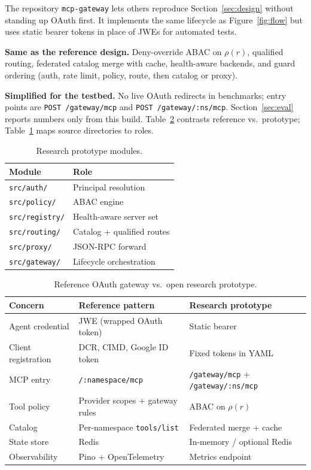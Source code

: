 \documentclass[11pt]{article}
\newcommand{\code}[1]{\texttt{#1}}
\begin{document}
The repository \code{mcp-gateway} lets others reproduce Section~\ref{sec:design} without standing up OAuth first.
It implements the same lifecycle as Figure~\ref{fig:flow} but uses static bearer tokens in place of JWEs for automated tests.

\textbf{Same as the reference design.}
Deny-override ABAC on $\rho(r)$, qualified routing, federated catalog merge with cache, health-aware backends, and guard ordering (auth, rate limit, policy, route, then catalog or proxy).

\textbf{Simplified for the testbed.}
No live OAuth redirects in benchmarks; entry points are \code{POST /gateway/mcp} and \code{POST /gateway/:ns/mcp}.
Section~\ref{sec:eval} reports numbers only from this build.
Table~\ref{tab:prod-vs-research} contrasts reference vs.\ prototype; Table~\ref{tab:modules} maps source directories to roles.

\begin{table}[H]
\centering
\caption{Research prototype modules.}
\label{tab:modules}
\small
\begin{tabular}{@{}ll@{}}
\toprule
Module & Role \\
\midrule
\code{src/auth/} & Principal resolution \\
\code{src/policy/} & ABAC engine \\
\code{src/registry/} & Health-aware server set \\
\code{src/routing/} & Catalog + qualified routes \\
\code{src/proxy/} & JSON-RPC forward \\
\code{src/gateway/} & Lifecycle orchestration \\
\bottomrule
\end{tabular}
\end{table}

\begin{table}[H]
\centering
\caption{Reference OAuth gateway vs.\ open research prototype.}
\label{tab:prod-vs-research}
\small
\begin{tabular}{@{}lll@{}}
\toprule
Concern & Reference pattern & Research prototype \\
\midrule
Agent credential & JWE (wrapped OAuth token) & Static bearer \\
Client registration & DCR, CIMD, Google ID token & Fixed tokens in YAML \\
MCP entry & \code{/:namespace/mcp} & \code{/gateway/mcp} + \code{/gateway/:ns/mcp} \\
Tool policy & Provider scopes + gateway rules & ABAC on $\rho(r)$ \\
Catalog & Per-namespace \code{tools/list} & Federated merge + cache \\
State store & Redis & In-memory / optional Redis \\
Observability & Pino + OpenTelemetry & Metrics endpoint \\
\bottomrule
\end{tabular}
\end{table}
\end{document}
